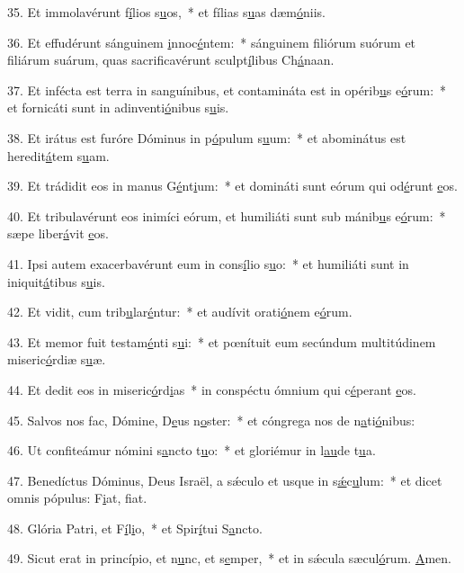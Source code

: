 35. Et immolavérunt f\uline{í}lios s\uline{u}os,~* et fílias s\uline{u}as dæm\uline{ó}niis.\par 
36. Et effudérunt sánguinem \uline{i}nnoc\uline{é}ntem:~* sánguinem filiórum suórum et filiárum suárum, quas sacrificavérunt sculpt\uline{í}libus Ch\uline{á}naan.\par 
37. Et infécta est terra in sanguínibus, et contamináta est in opérib\uline{u}s e\uline{ó}rum:~* et fornicáti sunt in adinventi\uline{ó}nibus s\uline{u}is.\par 
38. Et irátus est furóre Dóminus in p\uline{ó}pulum s\uline{u}um:~* et abominátus est heredit\uline{á}tem s\uline{u}am.\par 
39. Et trádidit eos in manus G\uline{é}nt\uline{i}um:~* et domináti sunt eórum qui od\uline{é}runt \uline{e}os.\par 
40. Et tribulavérunt eos inimíci eórum, et humiliáti sunt sub mánib\uline{u}s e\uline{ó}rum:~* sæpe liber\uline{á}vit \uline{e}os.\par 
41. Ipsi autem exacerbavérunt eum in cons\uline{í}lio s\uline{u}o:~* et humiliáti sunt in iniquit\uline{á}tibus s\uline{u}is.\par 
42. Et vidit, cum trib\uline{u}lar\uline{é}ntur:~* et audívit orati\uline{ó}nem e\uline{ó}rum.\par 
43. Et memor fuit testam\uline{é}nti s\uline{u}i:~* et pœnítuit eum secúndum multitúdinem miseric\uline{ó}rdiæ s\uline{u}æ.\par 
44. Et dedit eos in miseric\uline{ó}rd\uline{i}as~* in conspéctu ómnium qui c\uline{é}perant \uline{e}os.\par 
45. Salvos nos fac, Dómine, D\uline{e}us n\uline{o}ster:~* et cóngrega nos de n\uline{a}ti\uline{ó}nibus:\par 
46. Ut confiteámur nómini s\uline{a}ncto t\uline{u}o:~* et gloriémur in l\uline{au}de t\uline{u}a.\par 
47. Benedíctus Dóminus, Deus Israël, a sǽculo et usque in s\uline{ǽ}c\uline{u}lum:~* et dicet omnis pópulus: F\uline{i}at, f\uline{i}at.\par 
48. Glória Patri, et F\uline{í}l\uline{i}o,~* et Spir\uline{í}tui S\uline{a}ncto.\par 
49. Sicut erat in princípio, et n\uline{u}nc, et s\uline{e}mper,~* et in sǽcula sæcul\uline{ó}rum. \uline{A}men.\par 
